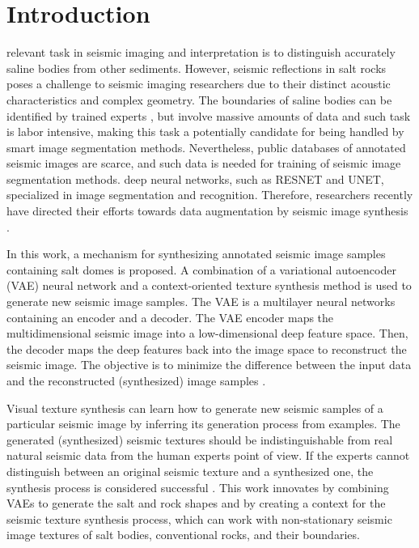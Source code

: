 \documentclass{ieeeaccess}
\begin{document}
\titlepgskip=-21pt

\maketitle

\section{Introduction}
\label{sec:introduction}
 relevant task in seismic imaging and interpretation is to distinguish accurately saline bodies from other sediments. However, seismic reflections in salt rocks poses a challenge to seismic imaging researchers due to their distinct acoustic characteristics and complex geometry.  The boundaries of saline bodies can be identified by trained experts \cite{ref5}, but involve massive amounts of data and such task is labor intensive, making this task a potentially candidate for being handled by smart image segmentation methods. Nevertheless, public databases of annotated seismic images are scarce, and such data is needed for training of seismic image segmentation methods. deep neural networks, such as RESNET and UNET, specialized in image segmentation and recognition. Therefore, researchers recently have directed their efforts towards data augmentation by seismic image synthesis \cite{ref1}.

In this work, a mechanism for synthesizing annotated seismic image samples containing salt domes is proposed. A combination of a variational autoencoder (VAE) neural network and a context-oriented texture synthesis method is used to generate new seismic image samples. The VAE is a  multilayer neural networks containing an encoder and a decoder. The VAE encoder maps the multidimensional seismic image into a low-dimensional deep feature space. Then, the decoder maps the deep features back into the image space to reconstruct the seismic image. The objective is to minimize the difference between the input data and the reconstructed (synthesized) image samples \cite{ref3}.

Visual texture synthesis can learn how to generate new seismic samples of a particular seismic image by inferring its generation process from examples. The generated (synthesized) seismic textures should be indistinguishable from real natural seismic data from the human experts point of view. If the experts cannot distinguish between an original seismic texture and a synthesized one, the synthesis process is considered successful \cite{ref4}. This work innovates by combining VAEs to generate the salt and rock shapes and by creating a context for the seismic texture synthesis process, which can work with non-stationary seismic image textures of salt bodies, conventional rocks, and their boundaries. 
\end{document}

